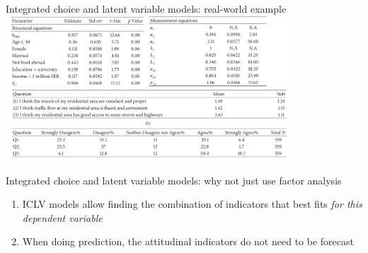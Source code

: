 \begin{frame}{Integrated choice and latent variable models: real-world example}
  \centering\includegraphics[width=0.8\textwidth]{fig/yazdanpanah_structural.png}\\
  {\tiny \textcite{yazdanpanah_impact_2017}}
\end{frame}

\begin{frame}{Integrated choice and latent variable models: why not just use factor analysis}
  \begin{enumerate}
    \item ICLV models allow finding the combination of indicators that best fits \emph{for this dependent variable}
    \item When doing prediction, the attitudinal indicators do not need to be forecast
  \end{enumerate}
\end{frame}
